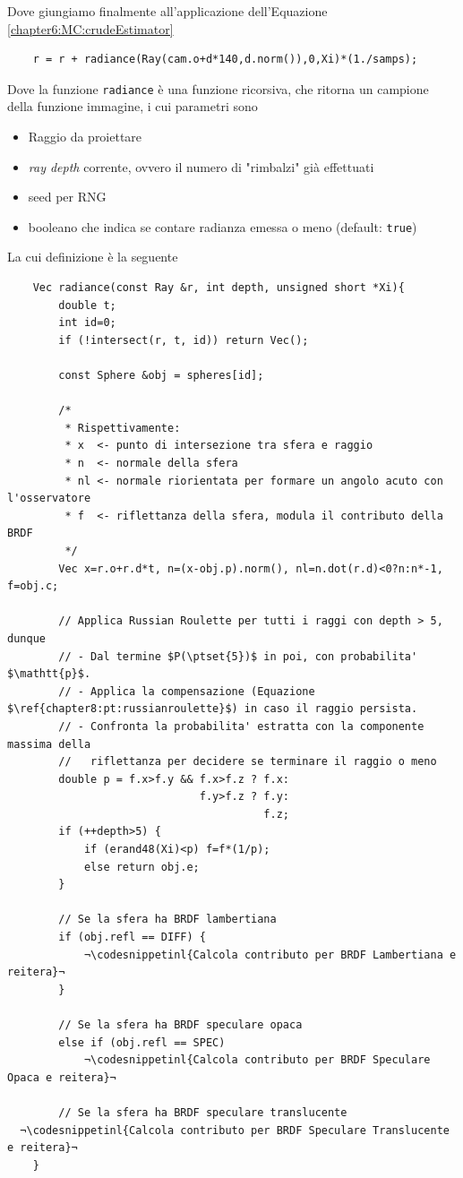 Dove giungiamo finalmente all'applicazione dell'Equazione \ref{chapter6:MC:crudeEstimator}
\begin{verbatim}
	r = r + radiance(Ray(cam.o+d*140,d.norm()),0,Xi)*(1./samps); 
\end{verbatim}
Dove la funzione \texttt{radiance} \`e una funzione ricorsiva, che ritorna un campione della funzione immagine, i cui parametri sono
\begin{itemize}[topsep=0pt,noitemsep]
	\item Raggio da proiettare
	\item \textit{ray depth} corrente, ovvero il numero di "rimbalzi" gi\`a effettuati
	\item seed per RNG
	\item booleano che indica se contare radianza emessa o meno (default: \texttt{true})
\end{itemize}
La cui definizione \`e la seguente
\begin{verbatim}
	Vec radiance(const Ray &r, int depth, unsigned short *Xi){ 
		double t;
		int id=0;
		if (!intersect(r, t, id)) return Vec();

		const Sphere &obj = spheres[id]; 

		/*
		 * Rispettivamente:
		 * x  <- punto di intersezione tra sfera e raggio
		 * n  <- normale della sfera
		 * nl <- normale riorientata per formare un angolo acuto con l'osservatore
		 * f  <- riflettanza della sfera, modula il contributo della BRDF
		 */
		Vec x=r.o+r.d*t, n=(x-obj.p).norm(), nl=n.dot(r.d)<0?n:n*-1, f=obj.c;

		// Applica Russian Roulette per tutti i raggi con depth > 5, dunque 
		// - Dal termine $P(\ptset{5})$ in poi, con probabilita' $\mathtt{p}$.
		// - Applica la compensazione (Equazione $\ref{chapter8:pt:russianroulette}$) in caso il raggio persista.
		// - Confronta la probabilita' estratta con la componente massima della 
		//   riflettanza per decidere se terminare il raggio o meno
		double p = f.x>f.y && f.x>f.z ? f.x:
		                      f.y>f.z ? f.y:
		                                f.z;
		if (++depth>5) {
			if (erand48(Xi)<p) f=f*(1/p); 
			else return obj.e;
		}

		// Se la sfera ha BRDF lambertiana
		if (obj.refl == DIFF) {
			¬\codesnippetinl{Calcola contributo per BRDF Lambertiana e reitera}¬
		} 

		// Se la sfera ha BRDF speculare opaca
		else if (obj.refl == SPEC)
			¬\codesnippetinl{Calcola contributo per BRDF Speculare Opaca e reitera}¬

		// Se la sfera ha BRDF speculare translucente
  ¬\codesnippetinl{Calcola contributo per BRDF Speculare Translucente e reitera}¬
	}
\end{verbatim}
